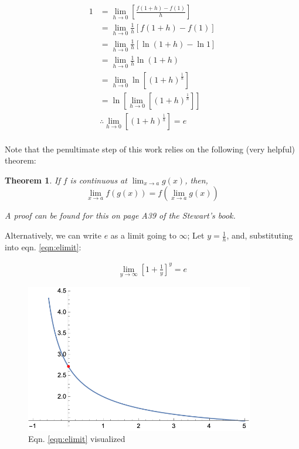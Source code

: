 \documentclass[12pt]{article}
\newtheorem*{theorem}{Theorem}
\begin{document}
\begin{equation}\label{eqn:elimit}
    \begin{split}
        1 &= \lim_{h \to 0}[\frac{f(1+h) - f(1)}{h}]\\
        &= \lim_{h\to 0}\frac{1}{h}[f(1+h)-f(1)]\\
        &= \lim_{h\to 0} \frac{1}{h}[\ln (1+h) - \ln 1]\\
        &= \lim_{h\to 0} \frac{1}{h} \ln(1+h)\\
        &= \lim_{h\to 0} \ln[(1+h)^{\frac{1}{h}}]\\
        &= \ln[\lim_{h\to 0}[(1+h)^{\frac{1}{h}}]]\\
        &\therefore \lim_{h\to 0}[(1+h)^{\frac{1}{h}}] = e\\
    \end{split}
\end{equation}

Note that the penultimate step of this work relies on the following (very helpful) theorem:

\begin{theorem}
    If $f$ is continuous at $\lim_{x\to a} g(x)$, then,
    $$\lim_{x\to a} f(g(x)) = f(\lim_{x\to a} g(x))$$

    \textit{A proof can be found for this on page A39 of the Stewart's book.}
\end{theorem}


Alternatively, we can write $e$ as a limit going to $\infty$; Let $y = \frac{1}{h}$, and, substituting into eqn. \ref{eqn:elimit}:

\begin{equation}
    \begin{split}
        \lim_{y\to\infty}[1+\frac{1}{y}]^y = e
    \end{split}
\end{equation}

\begin{figure}
    \centering
    \includegraphics[width=10.0cm]{misc/easalimit.png}
    \caption{Eqn. \ref{eqn:elimit} visualized}
\end{figure}
\end{document}
